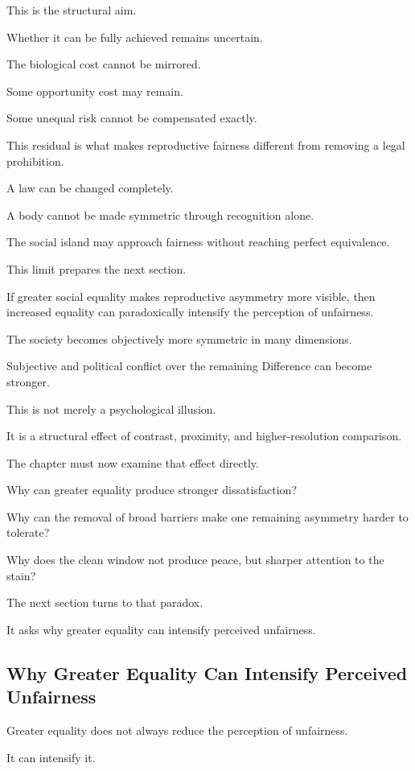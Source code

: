 This is the structural aim.

Whether it can be fully achieved remains uncertain.

The biological cost cannot be mirrored.

Some opportunity cost may remain.

Some unequal risk cannot be compensated exactly.

This residual is what makes reproductive fairness different from removing a legal prohibition.

A law can be changed completely.

A body cannot be made symmetric through recognition alone.

The social island may approach fairness without reaching perfect equivalence.

This limit prepares the next section.

If greater social equality makes reproductive asymmetry more visible, then increased equality can paradoxically intensify the perception of unfairness.

The society becomes objectively more symmetric in many dimensions.

Subjective and political conflict over the remaining Difference can become stronger.

This is not merely a psychological illusion.

It is a structural effect of contrast, proximity, and higher-resolution comparison.

The chapter must now examine that effect directly.

Why can greater equality produce stronger dissatisfaction?

Why can the removal of broad barriers make one remaining asymmetry harder to tolerate?

Why does the clean window not produce peace, but sharper attention to the stain?

The next section turns to that paradox.

It asks why greater equality can intensify perceived unfairness.

\subsection*{\textbf{Why Greater Equality Can Intensify Perceived Unfairness}}


Greater equality does not always reduce the perception of unfairness.

It can intensify it.

